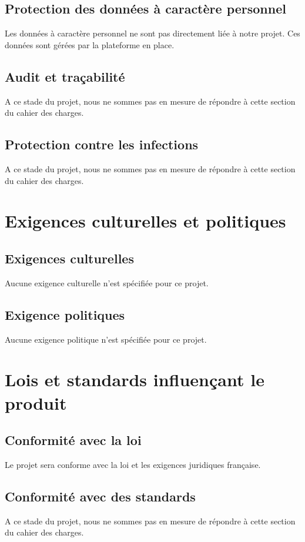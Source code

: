 		\subsection{Protection des données à caractère personnel}
		Les données à caractère personnel ne sont pas directement liée à notre projet. Ces données sont gérées par la plateforme en place. 
	
		\subsection{Audit et traçabilité}
A ce stade du projet, nous ne sommes pas en mesure de répondre à cette section du cahier des charges. 
	
		\subsection{Protection contre les infections}
		A ce stade du projet, nous ne sommes pas en mesure de répondre à cette section du cahier des charges. 
	
	
	\section{Exigences culturelles et politiques}
		\subsection{Exigences culturelles}
		Aucune exigence culturelle n'est spécifiée pour ce projet.
	
		\subsection{Exigence politiques}
		Aucune exigence politique n'est spécifiée pour ce projet.
	
	
	\section{Lois et standards influençant le produit}
		\subsection{Conformité avec la loi}
		Le projet sera conforme avec la loi et les exigences juridiques française. 
	
		\subsection{Conformité avec des standards}
		A ce stade du projet, nous ne sommes pas en mesure de répondre à cette section du cahier des charges. 

